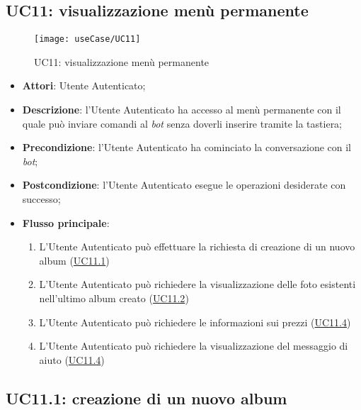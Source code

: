\newpage

\subsection{UC11: visualizzazione menù permanente}
\label{uc:uc11}
\hypertarget{UC11}{}

\begin{figure}[H]
  \centering
  \texttt{[image: useCase/UC11]}
  \caption{UC11: visualizzazione menù permanente}
\end{figure}

\begin{itemize}
  \item \textbf{Attori}: Utente Autenticato;
  \item \textbf{Descrizione}: l'Utente Autenticato ha accesso al menù
permanente con il quale può inviare comandi al \textit{bot} senza doverli
inserire tramite la tastiera;
  \item \textbf{Precondizione}: l'Utente Autenticato ha cominciato la
conversazione con il \textit{bot};
  \item \textbf{Postcondizione}: l'Utente Autenticato esegue le operazioni
desiderate con successo;
  \item \textbf{Flusso principale}:
  \begin{enumerate}
    \item L'Utente Autenticato può effettuare la richiesta di creazione di un
nuovo album (\hyperlink{UC11.1}{UC11.1})
    \item L'Utente Autenticato può richiedere la visualizzazione delle foto
esistenti nell'ultimo album creato (\hyperlink{UC11.2}{UC11.2})
    \item L'Utente Autenticato può richiedere le informazioni sui prezzi
(\hyperlink{UC11.3}{UC11.4})
    \item L'Utente Autenticato può richiedere la visualizzazione del messaggio
di aiuto (\hyperlink{UC11.4}{UC11.4})
  \end{enumerate}
\end{itemize}



\subsection{UC11.1: creazione di un nuovo album}
\label{uc:uc11.1}
\hypertarget{UC11.1}{}

